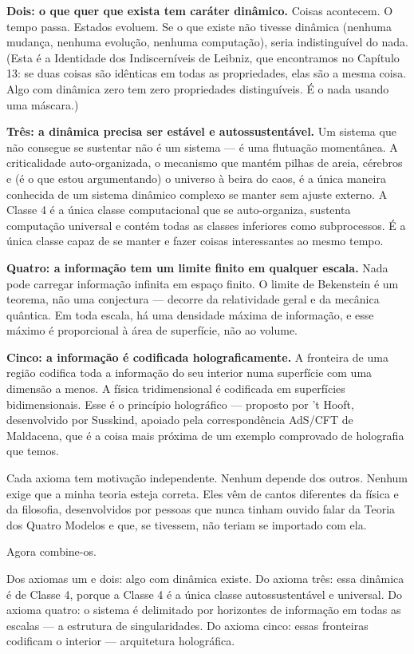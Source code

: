 \documentclass[11pt, twoside, openright]{book}
\begin{document}
\textbf{Dois: o que quer que exista tem caráter dinâmico.} Coisas acontecem. O tempo passa. Estados evoluem. Se o que existe não tivesse dinâmica (nenhuma mudança, nenhuma evolução, nenhuma computação), seria indistinguível do nada. (Esta é a Identidade dos Indiscerníveis de Leibniz, que encontramos no Capítulo 13: se duas coisas são idênticas em todas as propriedades, elas são a mesma coisa. Algo com dinâmica zero tem zero propriedades distinguíveis. É o nada usando uma máscara.)

\textbf{Três: a dinâmica precisa ser estável e autossustentável.} Um sistema que não consegue se sustentar não é um sistema --- é uma flutuação momentânea. A criticalidade auto-organizada, o mecanismo que mantém pilhas de areia, cérebros e (é o que estou argumentando) o universo à beira do caos, é a única maneira conhecida de um sistema dinâmico complexo se manter sem ajuste externo. A Classe 4 é a única classe computacional que se auto-organiza, sustenta computação universal e contém todas as classes inferiores como subprocessos. É a única classe capaz de se manter e fazer coisas interessantes ao mesmo tempo.

\textbf{Quatro: a informação tem um limite finito em qualquer escala.} Nada pode carregar informação infinita em espaço finito. O limite de Bekenstein é um teorema, não uma conjectura --- decorre da relatividade geral e da mecânica quântica. Em toda escala, há uma densidade máxima de informação, e esse máximo é proporcional à área de superfície, não ao volume.

\textbf{Cinco: a informação é codificada holograficamente.} A fronteira de uma região codifica toda a informação do seu interior numa superfície com uma dimensão a menos. A física tridimensional é codificada em superfícies bidimensionais. Esse é o princípio holográfico --- proposto por 't Hooft, desenvolvido por Susskind, apoiado pela correspondência AdS/\allowbreak{}CFT de Maldacena, que é a coisa mais próxima de um exemplo comprovado de holografia que temos.

Cada axioma tem motivação independente. Nenhum depende dos outros. Nenhum exige que a minha teoria esteja correta. Eles vêm de cantos diferentes da física e da filosofia, desenvolvidos por pessoas que nunca tinham ouvido falar da Teoria dos Quatro Modelos e que, se tivessem, não teriam se importado com ela.

Agora combine-os.

Dos axiomas um e dois: algo com dinâmica existe. Do axioma três: essa dinâmica é de Classe 4, porque a Classe 4 é a única classe autossustentável e universal. Do axioma quatro: o sistema é delimitado por horizontes de informação em todas as escalas --- a estrutura de singularidades. Do axioma cinco: essas fronteiras codificam o interior --- arquitetura holográfica.
\end{document}
